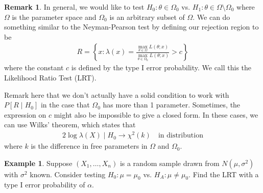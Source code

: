 \documentclass[11pt]{amsart}
\theoremstyle{definition}
\newtheorem{remark}[theorem]{Remark}
\newtheorem{example}[theorem]{Example}
\numberwithin{equation}{section}
\begin{document}
\begin{remark}
    In general, we would like to test $H_0:\theta\in\Omega_0$ vs. $H_1:\theta\in\Omega\setminus \Omega_0$ where $\Omega$ is the parameter space and $\Omega_0$ is an arbitrary subset of $\Omega$. We can do something similar to the Neyman-Pearson test by defining our rejection region to be
    \begin{align*}
        R=\left\{x:\lambda(x)=\frac{\max_{\theta\in\Omega} L(\theta;x)}{\max_{\theta\in\Omega_0} L(\theta;x)}>c\right\}
    \end{align*}
    where the constant $c$ is defined by the type I error probability. We call this the Likelihood Ratio Test (LRT).

    Remark here that we don't actually have a solid condition to work with $P[R\mid H_0]$ in the case that $\Omega_0$ has more than 1 parameter. Sometimes, the expression on $c$ might also be impossible to give a closed form. In these cases, we can use Wilks' theorem, which states that
    \begin{align*}
        2\log \lambda(X)\mid H_0\to\chi^2(k)\quad\text{in distribution}
    \end{align*}
    where $k$ is the difference in free parameters in $\Omega$ and $\Omega_0$.
\end{remark}
\begin{example}
    Suppose $(X_1,\ldots,X_n)$ is a random sample drawn from $N(\mu,\sigma^2)$ with $\sigma^2$ known. Consider testing $H_0:\mu=\mu_0$ vs. $H_A:\mu\ne\mu_0$. Find the LRT with a type I error probability of $\alpha$.
\end{example}
\addtocounter{theorem}{-1}
\end{document}
